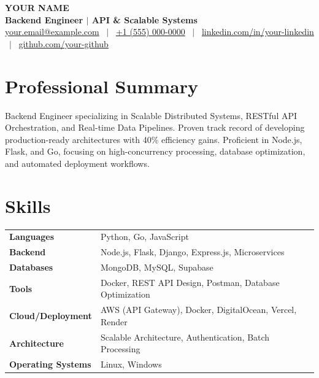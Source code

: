 \documentclass[a4paper,10pt]{article}
\begin{document}
\pagestyle{empty}

\begin{center}
{\LARGE \textbf{YOUR NAME}}\\[3pt]
\textbf{Backend Engineer $|$ API \& Scalable Systems}\\[3pt]
\href{mailto:your.email@example.com}{your.email@example.com}
~$|$~
\href{tel:+910000085302}{+1 (555) 000-0000}
~$|$~
\href{https://www.linkedin.com/in/your-linkedin/}{linkedin.com/in/your-linkedin}
~$|$~
\href{https://github.com/your-github}{github.com/your-github}
\end{center}

\vspace{-5pt}

\section*{Professional Summary}

Backend Engineer specializing in Scalable Distributed Systems, RESTful API Orchestration, and Real-time Data Pipelines. Proven track record of developing production-ready architectures with 40\% efficiency gains. Proficient in Node.js, Flask, and Go, focusing on high-concurrency processing, database optimization, and automated deployment workflows.

\section*{Skills}

\renewcommand{\arraystretch}{1.0}
\begin{tabular}{@{} >{\bfseries}p{3.8cm} p{13cm} @{}}
Languages           & Python, Go, JavaScript \\
Backend             & Node.js, Flask, Django, Express.js, Microservices \\
Databases           & MongoDB, MySQL, Supabase \\
Tools               & Docker, REST API Design, Postman, Database Optimization \\
Cloud/Deployment    & AWS (API Gateway), Docker, DigitalOcean, Vercel, Render \\
Architecture        & Scalable Architecture, Authentication, Batch Processing \\
Operating Systems   & Linux, Windows \\
\end{tabular}
\end{document}
